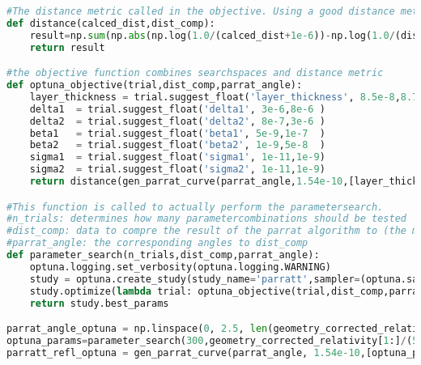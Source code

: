\begin{lstlisting}[language=python, caption=code for the optimization]
#The distance metric called in the objective. Using a good distance metric is critical here!    
def distance(calced_dist,dist_comp):  
    result=np.sum(np.abs(np.log(1.0/(calced_dist+1e-6))-np.log(1.0/(dist_comp+1e-6))))*(1/len(calced_dist))  
    return result

#the objective function combines searchspaces and distance metric
def optuna_objective(trial,dist_comp,parrat_angle):
    layer_thickness = trial.suggest_float('layer_thickness', 8.5e-8,8.7e-8)
    delta1  = trial.suggest_float('delta1', 3e-6,8e-6 )
    delta2  = trial.suggest_float('delta2', 8e-7,3e-6 )
    beta1   = trial.suggest_float('beta1', 5e-9,1e-7  )
    beta2   = trial.suggest_float('beta2', 1e-9,5e-8  )
    sigma1  = trial.suggest_float('sigma1', 1e-11,1e-9)
    sigma2  = trial.suggest_float('sigma2', 1e-11,1e-9)
    return distance(gen_parrat_curve(parrat_angle,1.54e-10,[layer_thickness,0],[delta1,delta2,0],[beta1,beta2,0],[sigma1,sigma2]),dist_comp)

#This function is called to actually perform the parametersearch. 
#n_trials: determines how many parametercombinations should be tested
#dist_comp: data to compre the result of the parrat algorithm to (the measured data)
#parrat_angle: the corresponding angles to dist_comp
def parameter_search(n_trials,dist_comp,parrat_angle):
    optuna.logging.set_verbosity(optuna.logging.WARNING)
    study = optuna.create_study(study_name='parratt',sampler=(optuna.samplers.TPESampler(seed=1)))
    study.optimize(lambda trial: optuna_objective(trial,dist_comp,parrat_angle), n_trials=n_trials, catch=True,show_progress_bar=True)
    return study.best_params

parrat_angle_optuna = np.linspace(0, 2.5, len(geometry_corrected_relativity))
optuna_params=parameter_search(300,geometry_corrected_relativity[1:]/(5*max_intensity),parrat_angle_optuna[1:])
parratt_refl_optuna = gen_parrat_curve(parrat_angle, 1.54e-10,[optuna_params['layer_thickness'],0],[optuna_params['delta1'],optuna_params['delta2'],0],[optuna_params['beta1'],optuna_params['beta2'],0],[optuna_params['sigma1'],optuna_params['sigma2']])
\end{lstlisting}